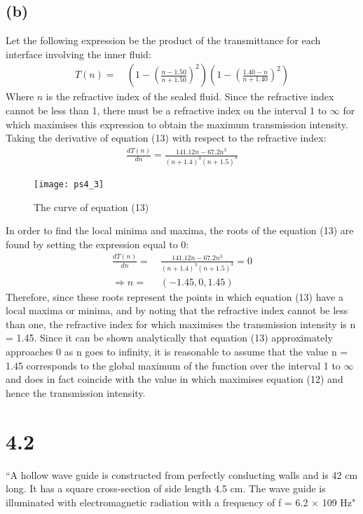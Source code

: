\documentclass[8pt,a4paper,oneside]{article}
\begin{document}
\subsection*{(b)}
Let the following expression be the product of the transmittance for each interface involving the inner fluid:
\begin{align}
	T(n) =&~\left(1 - \left(\frac{n - 1.50}{n + 1.50}\right)^2\right )\left(1 - \left(\frac{1.40 - n}{n + 1.40}\right)^2\right)
\end{align}
Where $n$ is the refractive index of the sealed fluid. Since the refractive index cannot be less than 1, there must be a refractive index on the interval 1 to $\infty $ for which maximises this expression to obtain the maximum transmission intensity. Taking the derivative of equation (13) with respect to the refractive index:
\begin{align}
	\frac{dT(n)}{dn} = \frac{141.12n-67.2 n^3}{(n+1.4)^3 (n+1.5)^3}
\end{align}
\begin{figure}[h!]
\begin{center}
\texttt{[image: ps4\_3]}
\caption{The curve of equation (13)}
\label{default}
\end{center}
\end{figure}

In order to find the local minima and maxima, the roots of the equation (13) are found by setting the expression equal to 0:
\begin{align}
	\frac{dT(n)}{dn} =&~ \frac{141.12n-67.2 n^3}{(n+1.4)^3 (n+1.5)^3} = 0\\
	\Rightarrow n =&~ (-1.45, 0, 1.45)
\end{align}
Therefore, since these roots represent the points in which equation (13) have a local maxima or minima, and by noting that the refractive index cannot be less than one, the refractive index for which maximises the transmission intensity is n = 1.45. Since it can be shown analytically that equation (13) approximately approaches 0 as n goes to infinity, it is reasonable to assume that the value n = 1.45 corresponds to the global maximum of the function over the interval 1 to $\infty$ and does in fact coincide with the value in which maximises equation (12) and hence the transmission intensity. 

\section*{4.2}
``A hollow wave guide is constructed from perfectly conducting walls and is 42 cm
long. It has a square cross-section of side length 4.5 cm. The wave guide is
illuminated with electromagnetic radiation with a frequency of f = 6.2 $\times$ 109 Hz"
\end{document}
